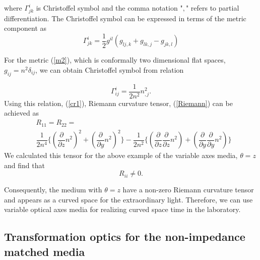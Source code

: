 \documentclass[9pt,twocolumn,twoside]{osajnl}
\begin{document}
where $\Gamma^{i}_{jk}$ is Christoffel symbol and the comma notation "$,$" refers to partial differentiation.  The Christoffel symbol can be expressed in terms of the metric component as
\begin{equation}\label{cr}
\Gamma^{i}_{jk}=\dfrac{1}{2} g^{il}(g_{lj,k}+g_{lk,j}-g_{jk,l})
\end{equation}

For the metric (\ref{m2}), which is conformally two dimensional flat spaces, $g_{ij}=n^{2}\delta_{ij}$,  we can obtain Christoffel symbol  from relation

\begin{equation}\label{cr1}
\Gamma^{i}_{ij}=\dfrac{1}{2n^{2}}n^{2}_{,j}.
\end{equation}
Using this relation, (\ref{cr1}), Riemann curvature tensor, (\ref{Riemann}) can be achieved as 
\begin{equation}
\begin{split}
&R_{11}=R_{22}=\\
&\dfrac{1}{2n^{4}} \lbrace (\dfrac{\partial}{\partial z}n^{2})^{2} +(\dfrac{\partial}{\partial y}n^{2})^{2}\rbrace -\dfrac{1}{2n^{2}}\lbrace(\dfrac{\partial}{\partial z}\dfrac{\partial}{\partial z}n^{2})+(\dfrac{\partial}{\partial y}\dfrac{\partial}{\partial y}n^{2})\rbrace
\end{split}
\end{equation}
We calculated this tensor for the above example of the variable axes media, $\theta=z$ and find that 
 \begin{equation}
R_{ii}\neq 0.
\end{equation}

Consequently, the medium with $\theta=z$ have a non-zero Riemann curvature tensor and appears as a curved space for the extraordinary light. Therefore, we can use variable optical axes media for realizing curved space time in the laboratory. 

\subsection{Transformation optics for the non-impedance matched media}
\end{document}
